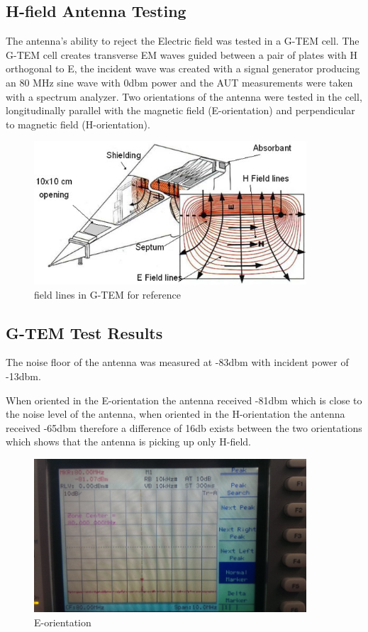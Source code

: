 \subsection{H-field Antenna Testing}

The antenna’s ability to reject the Electric field was tested in a G-TEM cell. The G-TEM cell creates transverse EM waves guided between a pair of plates with H orthogonal to E, the incident wave was created with a signal generator producing an 80 MHz sine wave with 0dbm power and the AUT measurements were taken with a spectrum analyzer. Two orientations of the antenna were tested in the cell, longitudinally parallel with the magnetic field (E-orientation) and perpendicular to magnetic field (H-orientation).

\begin{figure}[h]
	\begin{center}
		\includegraphics[width=4in]{./images/image9.jpeg}
		\caption{field lines in G-TEM for reference}
		\label{fig:hfield_fig9}
	\end{center}
\end{figure}

\subsection{G-TEM Test Results}

The noise floor of the antenna was measured at -83dbm with incident power of -13dbm.

When oriented in the E-orientation the antenna received -81dbm which is close to the noise level of the antenna, when oriented in the H-orientation the antenna received -65dbm therefore a difference of 16db exists between the two orientations which shows that the antenna is picking up only H-field.

\begin{figure}[h]
	\begin{center}
		\includegraphics[width=4in]{./images/Figure9.jpg}
		\caption{E-orientation}
		\label{fig:hfield_fig10}
	\end{center}
\end{figure}

